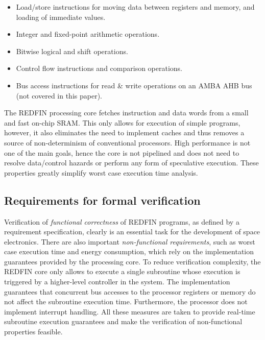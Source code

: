 \vspace{-0.5mm}
\begin{itemize}
\item{Load/store instructions for moving data between registers and memory, and
loading of immediate values.}
\item{Integer and fixed-point arithmetic operations.}
\item{Bitwise logical and shift operations.}
\item{Control flow instructions and comparison operations.}
\item{Bus access instructions for read \& write operations on an AMBA AHB bus
(not covered in this paper).}
\end{itemize}
\vspace{-0.5mm}

The REDFIN processing core fetches instruction and data words from a small and fast
on-chip SRAM. This only allows for execution of simple programs, however, it also
eliminates the need to implement caches and thus removes a source of non-determinism of
conventional processors. High performance is not one of the main goals, hence the
core is not pipelined and does not need to resolve data/control hazards or
perform any form of speculative execution. These properties greatly simplify
worst case execution time analysis.

\vspace{-1.2mm}
\subsection{Requirements for formal verification}
\vspace{-0.5mm}

Verification of \emph{functional correctness} of REDFIN programs, as defined by a
requirement specification, clearly is an essential task for the development of space
electronics. There are also important \emph{non-functional requirements}, such as
worst case execution time and energy consumption, which rely on the implementation
guarantees provided by the processing core. To reduce verification complexity,
the REDFIN core only allows to execute a single subroutine whose execution is triggered
by a higher-level controller in the system. The implementation guarantees that
concurrent bus accesses to the processor registers or memory do not affect
the subroutine execution time. Furthermore, the processor does not implement
interrupt handling. All these measures are taken to provide real-time
subroutine execution guarantees and make the verification of non-functional
properties feasible. %

